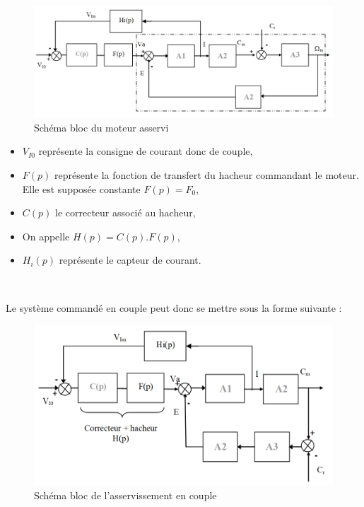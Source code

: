 \begin{figure}[!h]
\begin{center}
	\includegraphics[width=0.6\linewidth]{img/fig14}
\end{center}
	\caption{Schéma bloc du moteur asservi}
	\label{fig14}
\end{figure}
 
\begin{itemize}
 \item $V_{I0}$ représente la consigne de courant donc de couple,
 \item $F(p)$ représente la fonction de transfert du hacheur commandant le moteur. Elle est supposée constante $F(p)=F_0$,
 \item $C(p)$ le correcteur associé au hacheur,
 \item On appelle  $H(p)=C(p).F(p)$,
 \item $H_i(p)$ représente le capteur de courant.
\end{itemize}


~\

Le système commandé en couple peut donc se mettre sous la forme suivante :
 
\begin{figure}[!h]
\begin{center}
	\includegraphics[width=0.6\linewidth]{img/fig15}
\end{center}
	\caption{Schéma bloc de l'asservissement en couple}
	\label{fig15}
\end{figure}


